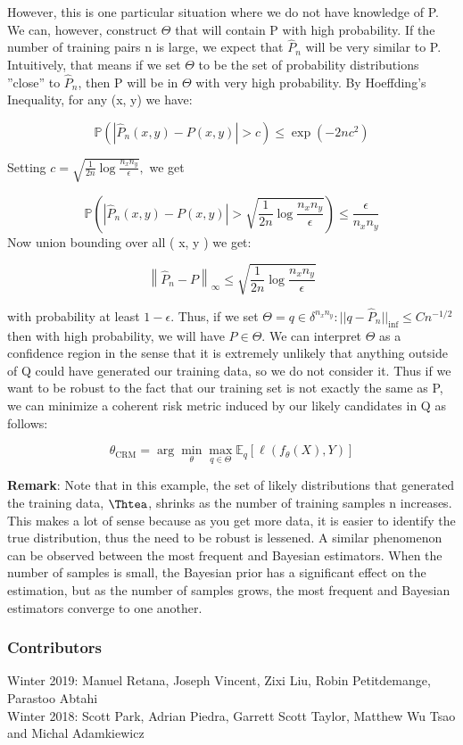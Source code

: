 \documentclass[twoside]{article}
\begin{document}
However, this is one particular situation where we do not have knowledge of P. We can, however, construct $\Theta$ that will contain P with high probability. If the number of training pairs n is large, we expect that $\hat{P}_n$ will be very similar to P. Intuitively, that means if we set $\Theta$ to be the set of probability distributions ”close” to $\hat{P}_n$, then P will be in $\Theta$ with very high probability. By Hoeffding’s Inequality, for any (x, y) we have:


$$ 
\mathbb{P}\left(\left|\widehat{P}_{n}(x, y)-P(x, y)\right|>c\right) \leq \exp \left(-2 n c^{2}\right)
 $$

Setting $c=\sqrt{\frac{1}{2 n} \log \frac{n_{x} n_{y}}{\epsilon}},$ we get

$$ 
\mathbb{P}\left(\left|\widehat{P}_{n}(x, y)-P(x, y)\right|>\sqrt{\frac{1}{2 n} \log \frac{n_{x} n_{y}}{\epsilon}}\right) \leq \frac{\epsilon}{n_{x} n_{y}}
 $$
Now union bounding over all ( x, y ) we get:

 $$ 
\left\|\widehat{P}_{n}-P\right\|_{\infty} \leq \sqrt{\frac{1}{2 n} \log \frac{n_{x} n_{y}}{\epsilon}}
 $$

with probability at least $1-\epsilon$. Thus, if we set $\Theta = {q \in \delta^{n_x n_y}: ||q-\hat{P}_n||_{\inf} \leq C n^{-1/2}}$ then with high probability, we will have $P \in \Theta$. We can interpret $\Theta$ as a confidence region in the sense that it is extremely unlikely that anything outside of Q could have generated our training data, so we do not consider it. Thus if we want to be robust to the fact that our training set is not exactly the same as P, we can minimize a coherent risk metric induced by our likely candidates in Q as follows:

$$ 
\theta_{\mathrm{CRM}}=\arg \min _{\theta} \max _{q \in \Theta} \mathbb{E}_{q}\left[\ell\left(f_{\theta}(X), Y\right)\right]
 $$

\textbf{Remark}: Note that in this example, the set of likely distributions that generated the training data, $\Thtea$, shrinks as the number of training samples n increases. This makes a lot of sense because as you get more data, it is easier to identify the true distribution, thus the need to be robust is lessened. A similar phenomenon can be observed between the most frequent and Bayesian estimators. When the number of samples
is small, the Bayesian prior has a significant effect on the estimation, but as the number of samples grows, the most frequent and Bayesian estimators converge to one another.
\printbibliography

\subsubsection*{Contributors}
Winter 2019: Manuel Retana, Joseph Vincent, Zixi Liu, Robin Petitdemange, Parastoo Abtahi\\
Winter 2018: Scott Park, Adrian Piedra, Garrett Scott Taylor, Matthew Wu Tsao and Michal Adamkiewicz
\end{document}
